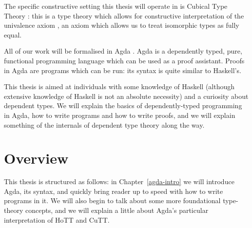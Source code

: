 The specific constructive setting this thesis will operate in is Cubical Type
Theory \cite{cohenCubicalTypeTheory2016}: this is a type theory which allows for
constructive interpretation of the univalence axiom \cite{hottbook} , an axiom which allows us to treat
isomorphic types as fully equal.

All of our work will be formalised in Agda
\cite{norellDependentlyTypedProgramming2008}.
Agda is a dependently typed, pure, functional programming language which can be
used as a proof assistant.
Proofs in Agda are programs which can be run: its syntax is quite similar to
Haskell's.

This thesis is aimed at individuals with some knowledge of Haskell (although
extensive knowledge of Haskell is not an absolute necessity) and a curiosity
about dependent types.
We will explain the basics of dependently-typed programming in Agda, how to
write programs and how to write proofs, and we will explain something of the
internals of dependent type theory along the way.



\section{Overview}
This thesis is structured as follows: in Chapter~\ref{agda-intro} we will
introduce Agda, its syntax, and quickly bring reader up to speed with how to
write programs in it.
We will also begin to talk about some more foundational type-theory concepts,
and we will explain a little about Agda's particular interpretation of HoTT and
CuTT.


